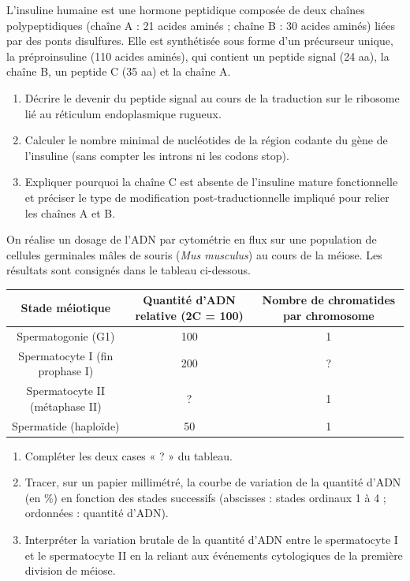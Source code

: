 \documentclass[11pt]{article}
\begin{document}
\begin{exercice}
L'insuline humaine est une hormone peptidique composée de deux chaînes polypeptidiques (chaîne A : 21 acides aminés ; chaîne B : 30 acides aminés) liées par des ponts disulfures. Elle est synthétisée sous forme d'un précurseur unique, la préproinsuline (110 acides aminés), qui contient un peptide signal (24 aa), la chaîne B, un peptide C (35 aa) et la chaîne A.
\begin{enumerate}
    \item Décrire le devenir du peptide signal au cours de la traduction sur le ribosome lié au réticulum endoplasmique rugueux.
    \item Calculer le nombre minimal de nucléotides de la région codante du gène de l'insuline (sans compter les introns ni les codons stop).
    \item Expliquer pourquoi la chaîne C est absente de l'insuline mature fonctionnelle et préciser le type de modification post-traductionnelle impliqué pour relier les chaînes A et B.
\end{enumerate}
\end{exercice}

\begin{exercice}
On réalise un dosage de l'ADN par cytométrie en flux sur une population de cellules germinales mâles de souris (\textit{Mus musculus}) au cours de la méiose. Les résultats sont consignés dans le tableau ci-dessous.
\begin{center}
\begin{tabular}{|c|c|c|}
\hline
\textbf{Stade méiotique} & \textbf{Quantité d'ADN relative (2C = 100)} & \textbf{Nombre de chromatides par chromosome} \\
\hline
Spermatogonie (G1) & 100 & 1 \\
\hline
Spermatocyte I (fin prophase I) & 200 & ? \\
\hline
Spermatocyte II (métaphase II) & ? & 1 \\
\hline
Spermatide (haploïde) & 50 & 1 \\
\hline
\end{tabular}
\end{center}
\begin{enumerate}
    \item Compléter les deux cases « ? » du tableau.
    \item Tracer, sur un papier millimétré, la courbe de variation de la quantité d'ADN (en \%) en fonction des stades successifs (abscisses : stades ordinaux 1 à 4 ; ordonnées : quantité d'ADN).
    \item Interpréter la variation brutale de la quantité d'ADN entre le spermatocyte I et le spermatocyte II en la reliant aux événements cytologiques de la première division de méiose.
\end{enumerate}
\end{exercice}
\end{document}
